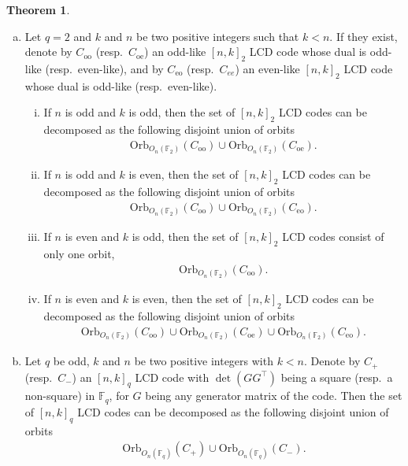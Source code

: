 \documentclass[11pt]{article}
\theoremstyle{definition}
\newtheorem{theorem}{Theorem}[section]
\newcommand{\F}{\mathbb{F}}
\newcommand{\Orb}{\mathrm{Orb}}
\newcommand{\CodeCeo}{C_{\mathrm{eo}}}
\newcommand{\CodeCoo}{C_{\mathrm{oo}}}
\newcommand{\CodeCoe}{C_{\mathrm{oe}}}
\newcommand{\Ort}{O}
\begin{document}
\begin{theorem}\cite[Theorem 12, Proposition 28]{CMTQ18}\label{thm:orbits}
	\begin{enumerate}[(a)]
		\item Let $q = 2$ and $k$ and $n$ be two positive integers such that $k < n$.
			If they exist, denote by $\CodeCoo$ (resp.\ $\CodeCoe$) an odd-like ${[n, k]}_2$ LCD code whose dual is odd-like (resp.\ even-like), and by $\CodeCeo$ (resp.\ $C_{ee}$) an even-like ${[n, k]}_2$ LCD code whose dual is odd-like (resp.\ even-like).
			\begin{enumerate}[(i)]
				\item If $n$ is odd and $k$ is odd, then the set of ${[n, k]}_2$ LCD codes can be decomposed as the following disjoint union of orbits
					\begin{align*}
						\Orb_{\Ort_n(\F_2)}(\CodeCoo) \cup \Orb_{\Ort_n(\F_2)}(\CodeCoe).
					\end{align*}
				\item If $n$ is odd and $k$ is even, then the set of ${[n, k]}_2$ LCD codes can be decomposed as the following disjoint union of orbits
					\begin{align*}
						\Orb_{\Ort_n(\F_2)}(\CodeCoo) \cup \Orb_{\Ort_n(\F_2)}(\CodeCeo).
					\end{align*}
				\item If $n$ is even and $k$ is odd, then the set of ${[n, k]}_2$ LCD codes consist of only one orbit,
					\begin{align*}
						\Orb_{\Ort_n(\F_2)}(\CodeCoo).
					\end{align*}
				\item If $n$ is even and $k$ is even, then the set of ${[n, k]}_2$ LCD codes can be decomposed as the following disjoint union of orbits
					\begin{align*}
						\Orb_{\Ort_n(\F_2)}(\CodeCoo) \cup \Orb_{\Ort_n(\F_2)}(\CodeCoe) \cup \Orb_{\Ort_n(\F_2)}(\CodeCeo).
					\end{align*}
			\end{enumerate}
		\item Let $q$ be odd, $k$ and $n$ be two positive integers with $k < n$.
			Denote by $C_+$ (resp.\ $C_-$) an ${[n, k]}_q$ LCD code with $\det(G G^\top)$ being a square (resp.\ a non-square) in $\F_q$, for $G$ being any generator matrix of the code.
			Then the set of ${[n, k]}_q$ LCD codes can be decomposed as the following disjoint union of orbits 
			\begin{align*}
				\Orb_{\Ort_n(\F_q)}(C_+) \cup \Orb_{\Ort_n(\F_q)}(C_-).
			\end{align*}
	\end{enumerate}
\end{theorem}
\end{document}

